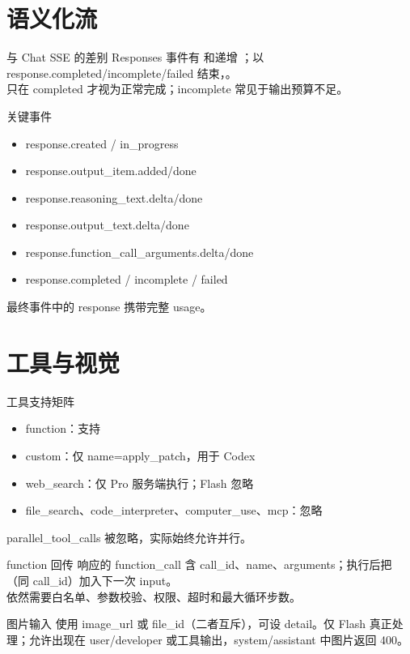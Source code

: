 \documentclass[aspectratio=169,UTF8]{ctexbeamer}
\begin{document}
\section{语义化流}
\begin{frame}{与 Chat SSE 的差别}
Responses 事件有  和递增 ；以 response.completed/incomplete/failed 结束，。\\[8pt]
只在 completed 才视为正常完成；incomplete 常见于输出预算不足。
\end{frame}
\begin{frame}{关键事件}
\small
\begin{itemize}
  \item response.created / in\_progress
  \item response.output\_item.added/done
  \item response.reasoning\_text.delta/done
  \item response.output\_text.delta/done
  \item response.function\_call\_arguments.delta/done
  \item response.completed / incomplete / failed
\end{itemize}
最终事件中的 response 携带完整 usage。
\end{frame}
\section{工具与视觉}
\begin{frame}{工具支持矩阵}
\begin{itemize}
  \item function：支持
  \item custom：仅 name=apply\_patch，用于 Codex
  \item web\_search：仅 Pro 服务端执行；Flash 忽略
  \item file\_search、code\_interpreter、computer\_use、mcp：忽略
\end{itemize}
parallel\_tool\_calls 被忽略，实际始终允许并行。
\end{frame}
\begin{frame}{function 回传}
响应的 function\_call 含 call\_id、name、arguments；执行后把 （同 call\_id）加入下一次 input。\\[8pt]
依然需要白名单、参数校验、权限、超时和最大循环步数。
\end{frame}
\begin{frame}{图片输入}
 使用 image\_url 或 file\_id（二者互斥），可设 detail。仅 Flash 真正处理；允许出现在 user/developer 或工具输出，system/assistant 中图片返回 400。
\end{frame}
\end{document}
